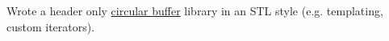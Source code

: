 {Wrote a header only \href{https://en.wikipedia.org/wiki/Circular_buffer}{circular buffer} library in an STL style (e.g. templating, custom iterators).}
